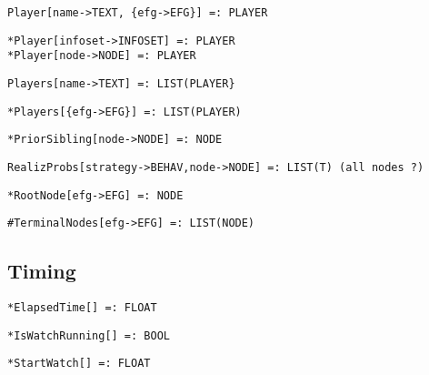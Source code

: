 \protect \large \begin{verbatim} 
Player[name->TEXT, {efg->EFG}] =: PLAYER
\end{verbatim}\normalsize

\protect \large \begin{verbatim}
*Player[infoset->INFOSET] =: PLAYER
*Player[node->NODE] =: PLAYER
\end{verbatim}\normalsize

\protect \large \begin{verbatim} 
Players[name->TEXT] =: LIST(PLAYER}
\end{verbatim}\normalsize

\protect \large \begin{verbatim}
*Players[{efg->EFG}] =: LIST(PLAYER)
\end{verbatim} \normalsize

\protect \large \begin{verbatim}
*PriorSibling[node->NODE] =: NODE
\end{verbatim}\normalsize

\protect \large \begin{verbatim}
RealizProbs[strategy->BEHAV,node->NODE] =: LIST(T) (all nodes ?)
\end{verbatim}\normalsize

\protect \large \begin{verbatim}
*RootNode[efg->EFG] =: NODE
\end{verbatim}\normalsize

\protect \large \begin{verbatim} 
#TerminalNodes[efg->EFG] =: LIST(NODE)
\end{verbatim}\normalsize


\medskip
\subsection{Timing}


\protect \large \begin{verbatim}
*ElapsedTime[] =: FLOAT
\end{verbatim}\normalsize


\protect \large \begin{verbatim}
*IsWatchRunning[] =: BOOL
\end{verbatim}\normalsize


\protect \large \begin{verbatim}
*StartWatch[] =: FLOAT
\end{verbatim}\normalsize


